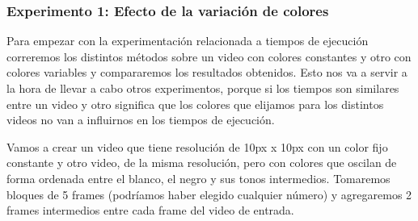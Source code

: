 \subsubsection{Experimento 1: Efecto de la variaci\'on de colores}
\par Para empezar con la experimentaci\'on relacionada a tiempos de ejecuci\'on correremos los distintos m\'etodos sobre un video con colores constantes y otro con colores variables y compararemos los resultados obtenidos. Esto nos va a servir a la hora de llevar a cabo otros experimentos, porque si los tiempos son similares entre un video y otro significa que los colores que elijamos para los distintos videos no van a influirnos en los tiempos de ejecuci\'on.

\par Vamos a crear un video que tiene resoluci\'on de 10px x 10px con un color fijo constante y otro video, de la misma resoluci\'on, pero con colores que oscilan de forma ordenada entre el blanco, el negro y sus tonos intermedios. Tomaremos bloques de 5 frames (podr\'iamos haber elegido cualquier n\'umero) y agregaremos 2 frames intermedios entre cada frame del video de entrada.



\begin{figure}[ht]
	\begin{center}
	\end{center}
\end{figure}


